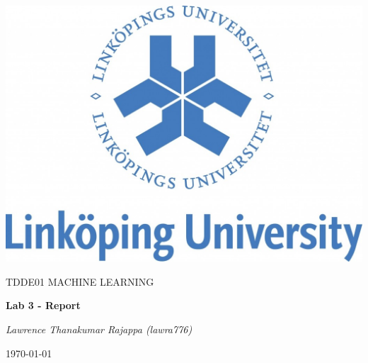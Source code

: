 \documentclass[a4paper,10pt]{article}
\begin{document}
\begin{titlepage}
	\centering
	\includegraphics[width=.6\textwidth]{liu-logo.png}\par
	\vfill
	{\scshape\Large TDDE01 MACHINE LEARNING\par}
	{\huge\bfseries Lab 3 - Report\par}
	\vspace{0.5cm}
	{\large\itshape Lawrence Thanakumar Rajappa (lawra776)\par}
	\vfill
	{\large \today\par}
\end{titlepage}
\end{document}
